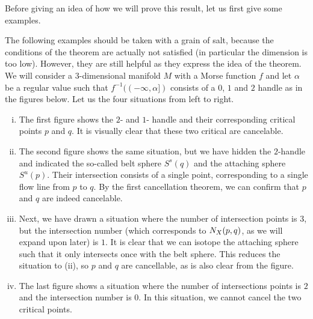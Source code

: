 Before giving an idea of how we will prove this result, let us first give some examples.
\begin{eg}
    The following examples should be taken with a grain of salt, because the conditions of the theorem are actually not satisfied (in particular the dimension is too low).
    However, they are still helpful as they express the idea of the theorem.
    We will consider a $3$-dimensional manifold $M$ with a Morse function $f$ and let $\alpha$ be a regular value such that  $f^{-1}((-\infty, \alpha])$ consists of a $0$, $1$ and  $2$ handle as in the figures below.
    Let us the four situations from left to right.
    \begin{enumerate}[(i)]
        \item The first figure shows the $2$- and  $1$- handle and their corresponding critical points $p$ and  $q$.
            It is visually clear that these two critical are cancelable.
        \item The second figure shows the same situation, but we have hidden the $2$-handle and indicated the so-called belt sphere $S^{s}(q)$ and the attaching sphere $S^{u}(p)$. Their intersection consists of a single point, corresponding to a single flow line from $p$ to $q$. 
            By the first cancellation theorem, we can confirm that $p$ and  $q$ are indeed cancelable.
        \item Next, we have drawn a situation where the number of intersection points is $3$, but the intersection number (which corresponds to $N_{X}(p, q)$, as we will expand upon later) is $1$. It is clear that we can isotope the attaching sphere such that it only intersects once with the belt sphere.
            This reduces the situation to (ii), so $p$ and  $q$ are cancellable, as is also clear from the figure. 
        \item The last figure shows a situation where the number of intersections points is $2$ and the intersection number is $0$. In this situation, we cannot cancel the two critical points.
    \end{enumerate}
    \begin{figure}[H]
    \centering
\end{figure}
\end{eg}

